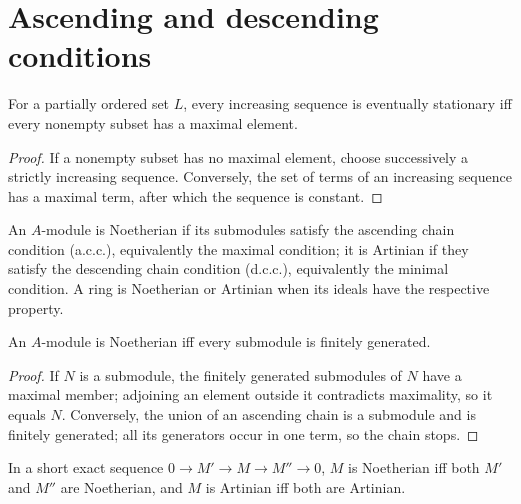 \section{Ascending and descending conditions}
\label{am-ch6-chains}
\begin{proposition}
\label{am-prop-6-1}
\uses{}
For a partially ordered set $L$, every increasing sequence is eventually
stationary iff every nonempty subset has a maximal element.
\end{proposition}
\begin{proof}
If a nonempty subset has no maximal element, choose successively a strictly
increasing sequence.  Conversely, the set of terms of an increasing sequence
has a maximal term, after which the sequence is constant.
\end{proof}
\begin{definition}
\label{am-def-noeth-artin-module}
\uses{}
An $A$-module is Noetherian if its submodules satisfy the ascending chain
condition (a.c.c.), equivalently the maximal condition; it is Artinian if they
satisfy the descending chain condition (d.c.c.), equivalently the minimal
condition.  A ring is Noetherian or Artinian when its ideals have the respective
property.
\end{definition}
\begin{proposition}
\label{am-prop-6-2}
\uses{}
An $A$-module is Noetherian iff every submodule is finitely generated.
\end{proposition}
\begin{proof}
If $N$ is a submodule, the finitely generated submodules of $N$ have a maximal
member; adjoining an element outside it contradicts maximality, so it equals
$N$.  Conversely, the union of an ascending chain is a submodule and is
finitely generated; all its generators occur in one term, so the chain stops.
\end{proof}
\begin{proposition}
\label{am-prop-6-3}
\uses{}
In a short exact sequence $0\to M'\to M\to M''\to0$, $M$ is Noetherian iff
both $M'$ and $M''$ are Noetherian, and $M$ is Artinian iff both are Artinian.
\end{proposition}
